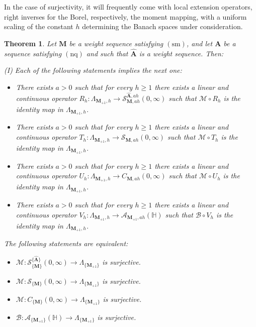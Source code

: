 \documentclass[12pt,a4paper]{article}
\newcommand{\HH}{\mathbb{H}}
\newcommand{\CM}{C_{\{\M\}}(0,\infty)}
\newcommand{\M}{{\boldsymbol{M}}}
\newcommand{\A}{{\boldsymbol{A}}}
\newcommand{\hA}{\widehat{{\boldsymbol{A}}}}
\newcommand{\nq}{\operatorname{(nq)}}
\newcommand{\sm}{\operatorname{(sm)}}
\theoremstyle{plain}
\newtheorem{theorem}{Theorem}[section]
\theoremstyle{definition}
\numberwithin{equation}{section}
\begin{document}
In the case of surjectivity, it will frequently come with local extension operators, right inverses for the Borel, respectively, the moment mapping, with a uniform scaling of the constant $h$ determining the Banach spaces under consideration.

\begin{theorem} \label{surj-stiel-modified-dm}
Let $\M$ be a weight sequence satisfying $\sm$,
and let $\A$ be a sequence satisfying $\nq$ and such that $\hA$ is a weight sequence. Then:\par\noindent
(I) Each of the following statements implies the next one:
\begin{itemize}
\item[$(i)$] There exists $a>0$ such that for every $h\ge 1$ there exists a linear and continuous operator $R_h\colon \Lambda_{\M_{+1},h}\to\mathcal{S}^{\hA,ah}_{\M,ah}(0,\infty)$ such that $\mathcal{M}\circ R_h$ is the identity map in $\Lambda_{\M_{+1},h}$.
\item[$(ii)$] There exists $a>0$ such that for every $h\ge 1$ there exists a linear and continuous operator $T_h\colon \Lambda_{\M_{+1},h}\to\mathcal{S}_{\M,ah}(0,\infty)$ such that $\mathcal{M}\circ T_h$ is the identity map in $\Lambda_{\M_{+1},h}$.
\item[$(iii)$] There exists $a>0$ such that for every $h\ge 1$ there exists a linear and continuous operator $U_h\colon \Lambda_{\M_{+1},h}\to C_{\M,ah}(0,\infty)$ such that $\mathcal{M}\circ U_h$ is the identity map in $\Lambda_{\M_{+1},h}$.
\item[$(iv)$] There exists $a>0$ such that for every $h\ge 1$ there exists a linear and continuous operator $V_h\colon \Lambda_{\M_{+1},h}\to\mathcal{A}_{\M_{+1},ah}(\HH)$ such that $\mathcal{B}\circ V_h$ is the identity map in $\Lambda_{\M_{+1},h}$.
\end{itemize}
The following statements are equivalent:
\begin{itemize}
\item[$(i')$] $\mathcal{M}: \mathcal{S}^{\{\hA\}}_{\{\M\}}(0,\infty) \rightarrow \Lambda_{\{\M_{+1}\}}$ is surjective.
\item[$(ii')$] $\mathcal{M}: \mathcal{S}_{\{\M\}}(0,\infty) \rightarrow \Lambda_{\{\M_{+1}\}}$ is surjective.
\item[$(iii')$] $\mathcal{M}: \CM \rightarrow \Lambda_{\{\M_{+1}\}}$ is surjective.
\item[$(iv')$] $\mathcal{B}: \mathcal{A}_{\{\M_{+1}\}}(\HH) \rightarrow \Lambda_{\{\M_{+1}\}}$ is surjective.
\end{itemize}

\end{theorem}
\end{document}
